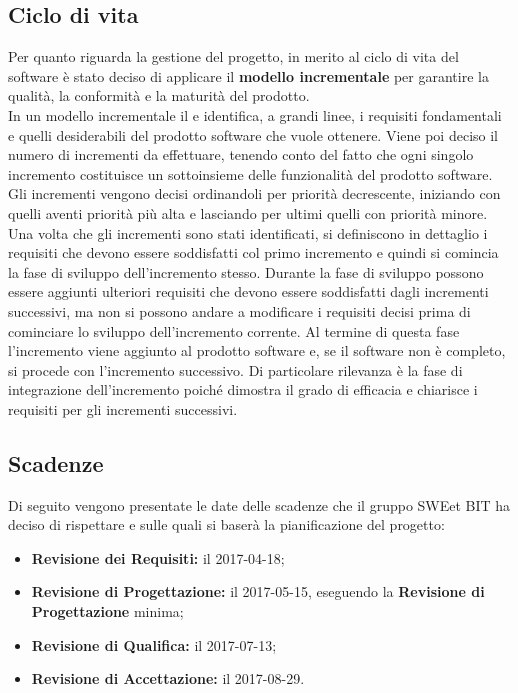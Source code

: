 \subsection{Ciclo di vita}
Per quanto riguarda la gestione del progetto, in merito al ciclo di vita del software è stato deciso di applicare il \textbf{modello incrementale} per garantire la qualità, la conformità e la maturità del prodotto. \\
In un modello incrementale il e identifica, a grandi linee, i requisiti fondamentali e quelli desiderabili del prodotto software che vuole ottenere. Viene poi deciso il numero di incrementi da effettuare, tenendo conto del fatto che ogni singolo incremento costituisce un sottoinsieme delle funzionalità del prodotto software. Gli incrementi vengono decisi ordinandoli per priorità decrescente, iniziando con quelli aventi priorità più alta e lasciando per ultimi quelli con priorità minore. Una volta che gli incrementi sono stati identificati, si definiscono in dettaglio i requisiti che devono essere soddisfatti col primo incremento e quindi si comincia la fase di sviluppo dell'incremento stesso. Durante la fase di sviluppo possono essere aggiunti ulteriori requisiti che devono essere soddisfatti dagli incrementi successivi, ma non si possono andare a modificare i requisiti decisi prima di cominciare lo sviluppo dell'incremento corrente. Al termine di questa fase l'incremento viene aggiunto al prodotto software e, se il software non è completo, si procede con l'incremento successivo. Di particolare rilevanza è la fase di integrazione dell'incremento poiché dimostra il grado di efficacia e chiarisce i requisiti per gli incrementi successivi.
\subsection{Scadenze}
Di seguito vengono presentate le date delle scadenze che il gruppo SWEet BIT ha deciso di rispettare e sulle quali si baserà la pianificazione del progetto: \\
\begin{itemize}
	\item \textbf{Revisione dei Requisiti:} il 2017-04-18;
	\item \textbf{Revisione di Progettazione:} il 2017-05-15, eseguendo la \textbf{Revisione di Progettazione} minima;
	\item \textbf{Revisione di Qualifica:} il 2017-07-13;
	\item \textbf{Revisione di Accettazione:} il 2017-08-29.
\end{itemize}